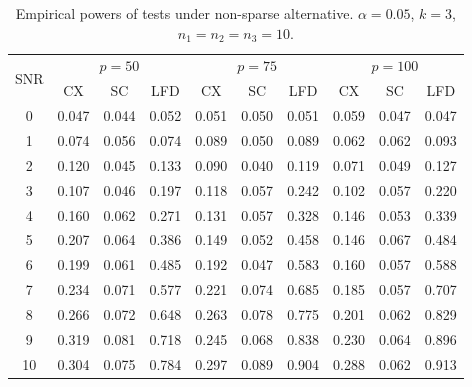 \documentclass[12pt]{article} %
\theoremstyle{definition}
\begin{document}
\begin{table}[!hbp]
    \caption{Empirical powers of tests under non-sparse alternative. $\alpha=0.05$, $k=3$, $n_1=n_2=n_3=10$. }
    \label{table1}
    \centering
    \begin{tabular}{*{10}{c}}
    \toprule
    \multirow{2}{*}{SNR} &\multicolumn{3}{c}{$p=50$}&\multicolumn{3}{c}{$p=75$}&\multicolumn{3}{c}{$p=100$} \\
        \cmidrule(r){2-4}\cmidrule(r){5-7}\cmidrule(r){8-10}
        & CX & SC & LFD & CX &SC &LFD &CX & SC & LFD\\
    \midrule
0 & 0.047 & 0.044 & 0.052 & 0.051 & 0.050 & 0.051 & 0.059 & 0.047 & 0.047 \\ 
1 & 0.074 & 0.056 & 0.074 & 0.089 & 0.050 & 0.089 & 0.062 & 0.062 & 0.093 \\ 
2 & 0.120 & 0.045 & 0.133 & 0.090 & 0.040 & 0.119 & 0.071 & 0.049 & 0.127 \\ 
3 & 0.107 & 0.046 & 0.197 & 0.118 & 0.057 & 0.242 & 0.102 & 0.057 & 0.220 \\ 
4 & 0.160 & 0.062 & 0.271 & 0.131 & 0.057 & 0.328 & 0.146 & 0.053 & 0.339 \\ 
5 & 0.207 & 0.064 & 0.386 & 0.149 & 0.052 & 0.458 & 0.146 & 0.067 & 0.484 \\ 
6 & 0.199 & 0.061 & 0.485 & 0.192 & 0.047 & 0.583 & 0.160 & 0.057 & 0.588 \\ 
7 & 0.234 & 0.071 & 0.577 & 0.221 & 0.074 & 0.685 & 0.185 & 0.057 & 0.707 \\ 
8 & 0.266 & 0.072 & 0.648 & 0.263 & 0.078 & 0.775 & 0.201 & 0.062 & 0.829 \\ 
9 & 0.319 & 0.081 & 0.718 & 0.245 & 0.068 & 0.838 & 0.230 & 0.064 & 0.896 \\ 
10 & 0.304 & 0.075 & 0.784 & 0.297 & 0.089 & 0.904 & 0.288 & 0.062 & 0.913 \\ 
\bottomrule
\end{tabular}
\end{table}
\end{document}
